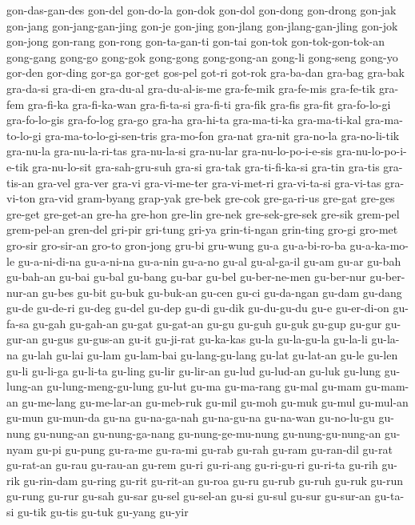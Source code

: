 {gon-das-gan-des gon-del gon-do-la gon-dok gon-dol gon-dong gon-drong
gon-jak gon-jang gon-jang-gan-jing gon-je gon-jing gon-jlang
gon-jlang-gan-jling gon-jok gon-jong gon-rang gon-rong gon-ta-gan-ti
gon-tai gon-tok gon-tok-gon-tok-an gong-gang gong-go gong-gok gong-gong
gong-gong-an gong-li gong-seng gong-yo gor-den gor-ding gor-ga gor-get
gos-pel got-ri got-rok gra-ba-dan gra-bag gra-bak gra-da-si gra-di-en
gra-du-al gra-du-al-is-me gra-fe-mik gra-fe-mis gra-fe-tik gra-fem
gra-fi-ka gra-fi-ka-wan gra-fi-ta-si gra-fi-ti gra-fik gra-fis gra-fit
gra-fo-lo-gi gra-fo-lo-gis gra-fo-log gra-go gra-ha gra-hi-ta gra-ma-ti-ka
gra-ma-ti-kal gra-ma-to-lo-gi gra-ma-to-lo-gi-sen-tris gra-mo-fon gra-nat
gra-nit gra-no-la gra-no-li-tik gra-nu-la gra-nu-la-ri-tas gra-nu-la-si
gra-nu-lar gra-nu-lo-po-i-e-sis gra-nu-lo-po-i-e-tik gra-nu-lo-sit
gra-sah-gru-suh gra-si gra-tak gra-ti-fi-ka-si gra-tin gra-tis gra-tis-an
gra-vel gra-ver gra-vi gra-vi-me-ter gra-vi-met-ri gra-vi-ta-si gra-vi-tas
gra-vi-ton gra-vid gram-byang grap-yak gre-bek gre-cok gre-ga-ri-us
gre-gat gre-ges gre-get gre-get-an gre-ha gre-hon gre-lin gre-nek
gre-sek-gre-sek gre-sik grem-pel grem-pel-an gren-del gri-pir gri-tung
gri-ya grin-ti-ngan grin-ting gro-gi gro-met gro-sir gro-sir-an gro-to
gron-jong gru-bi gru-wung gu-a gu-a-bi-ro-ba gu-a-ka-mo-le gu-a-ni-di-na
gu-a-ni-na gu-a-nin gu-a-no gu-al gu-al-ga-il gu-am gu-ar gu-bah gu-bah-an
gu-bai gu-bal gu-bang gu-bar gu-bel gu-ber-ne-men gu-ber-nur gu-ber-nur-an
gu-bes gu-bit gu-buk gu-buk-an gu-cen gu-ci gu-da-ngan gu-dam gu-dang
gu-de gu-de-ri gu-deg gu-del gu-dep gu-di gu-dik gu-du-gu-du gu-e
gu-er-di-on gu-fa-sa gu-gah gu-gah-an gu-gat gu-gat-an gu-gu gu-guh gu-guk
gu-gup gu-gur gu-gur-an gu-gus gu-gus-an gu-it gu-ji-rat gu-ka-kas gu-la
gu-la-gu-la gu-la-li gu-la-na gu-lah gu-lai gu-lam gu-lam-bai
gu-lang-gu-lang gu-lat gu-lat-an gu-le gu-len gu-li gu-li-ga gu-li-ta
gu-ling gu-lir gu-lir-an gu-lud gu-lud-an gu-luk gu-lung gu-lung-an
gu-lung-meng-gu-lung gu-lut gu-ma gu-ma-rang gu-mal gu-mam gu-mam-an
gu-me-lang gu-me-lar-an gu-meb-ruk gu-mil gu-moh gu-muk gu-mul gu-mul-an
gu-mun gu-mun-da gu-na gu-na-ga-nah gu-na-gu-na gu-na-wan gu-no-lu-gu
gu-nung gu-nung-an gu-nung-ga-nang gu-nung-ge-mu-nung gu-nung-gu-nung-an
gu-nyam gu-pi gu-pung gu-ra-me gu-ra-mi gu-rab gu-rah gu-ram gu-ran-dil
gu-rat gu-rat-an gu-rau gu-rau-an gu-rem gu-ri gu-ri-ang gu-ri-gu-ri
gu-ri-ta gu-rih gu-rik gu-rin-dam gu-ring gu-rit gu-rit-an gu-roa gu-ru
gu-rub gu-ruh gu-ruk gu-run gu-rung gu-rur gu-sah gu-sar gu-sel gu-sel-an
gu-si gu-sul gu-sur gu-sur-an gu-ta-si gu-tik gu-tis gu-tuk gu-yang gu-yir
}
